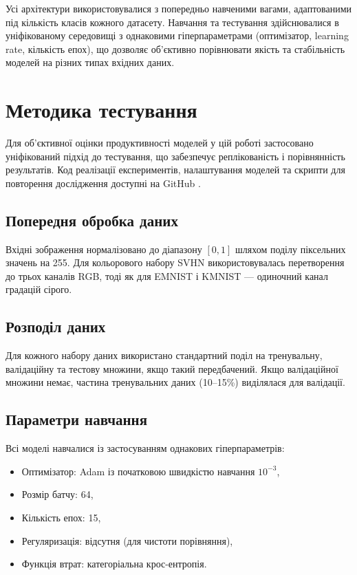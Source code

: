 \documentclass[14pt,a4paper]{extarticle}
\begin{document}
\medskip
Усі архітектури використовувалися з попередньо навченими вагами, адаптованими під кількість класів кожного датасету. Навчання та тестування здійснювалися в уніфікованому середовищі з однаковими гіперпараметрами (оптимізатор, learning rate, кількість епох), що дозволяє об'єктивно порівнювати якість та стабільність моделей на різних типах вхідних даних.


\section{Методика тестування}
\label{sec:testing_methodology}

Для об’єктивної оцінки продуктивності моделей у цій роботі застосовано уніфікований підхід до тестування, що забезпечує реплікованість і порівнянність результатів. Код реалізації експериментів, налаштування моделей та скрипти для повторення дослідження доступні на GitHub \cite{neurovisionlab2025}.

\subsection{Попередня обробка даних}
Вхідні зображення нормалізовано до діапазону \([0, 1]\) шляхом поділу піксельних значень на 255. Для кольорового набору SVHN використовувалась перетворення до трьох каналів RGB, тоді як для EMNIST і KMNIST — одиночний канал градацій сірого.

\subsection{Розподіл даних}
Для кожного набору даних використано стандартний поділ на тренувальну, валідаційну та тестову множини, якщо такий передбачений. Якщо валідаційної множини немає, частина тренувальних даних (10–15\%) виділялася для валідації.

\subsection{Параметри навчання}
Всі моделі навчалися із застосуванням однакових гіперпараметрів: 

\begin{itemize}[leftmargin=*]
  \item Оптимізатор: Adam із початковою швидкістю навчання \(10^{-3}\),
  \item Розмір батчу: 64,
  \item Кількість епох: 15,
  \item Регуляризація: відсутня (для чистоти порівняння),
  \item Функція втрат: категоріальна крос-ентропія.
\end{itemize}
\end{document}
